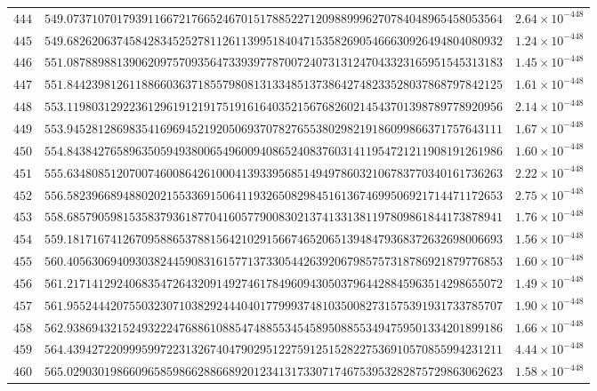 \documentclass[12pt,reqno]{amsart}
\theoremstyle{remark}
\begin{document}
\begin{longtable}{clc}
$444$ & $549.0737107017939116672176652467015178852271209889996270784048965458053564$ & $2.64\times 10^{-448}$ \\
$445$ & $549.6826206374584283452527811261139951840471535826905466630926494804080932$ & $1.24\times 10^{-448}$ \\
$446$ & $551.0878898813906209757093564733939778700724073131247043323165951545313183$ & $1.45\times 10^{-448}$ \\
$447$ & $551.8442398126118866036371855798081313348513738642748233528037868797842125$ & $1.61\times 10^{-448}$ \\
$448$ & $553.1198031292236129619121917519161640352156768260214543701398789778920956$ & $2.14\times 10^{-448}$ \\
$449$ & $553.9452812869835416969452192050693707827655380298219186099866371757643111$ & $1.67\times 10^{-448}$ \\
$450$ & $554.8438427658963505949380065496009408652408376031411954721211908191261986$ & $1.60\times 10^{-448}$ \\
$451$ & $555.6348085120700746008642610004139339568514949786032106783770340161736263$ & $2.22\times 10^{-448}$ \\
$452$ & $556.5823966894880202155336915064119326508298451613674699506921714471172653$ & $2.75\times 10^{-448}$ \\
$453$ & $558.6857905981535837936187704160577900830213741331381197809861844173878941$ & $1.76\times 10^{-448}$ \\
$454$ & $559.1817167412670958865378815642102915667465206513948479368372632698006693$ & $1.56\times 10^{-448}$ \\
$455$ & $560.4056306940930382445908316157713733054426392067985757318786921879776853$ & $1.60\times 10^{-448}$ \\
$456$ & $561.2171412924068354726432091492746178496094305037964428845963514298655072$ & $1.49\times 10^{-448}$ \\
$457$ & $561.9552444207550323071038292444040177999374810350082731575391931733785707$ & $1.90\times 10^{-448}$ \\
$458$ & $562.9386943215249322247688610885474885534545895088553494759501334201899186$ & $1.66\times 10^{-448}$ \\
$459$ & $564.4394272209995997223132674047902951227591251528227536910570855994231211$ & $4.44\times 10^{-448}$ \\
$460$ & $565.0290301986609658598662886689201234131733071746753953282875729863062623$ & $1.58\times 10^{-448}$ \\

\end{longtable}
\end{document}
